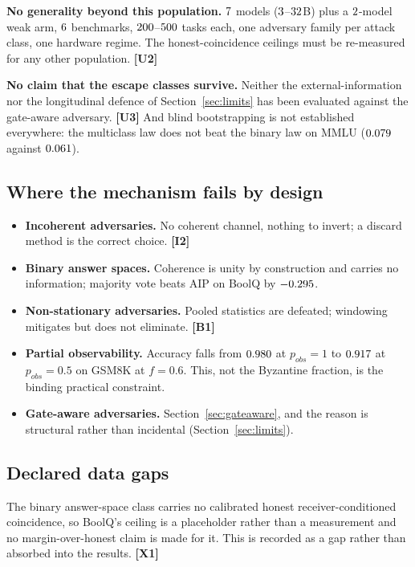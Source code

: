 \textbf{No generality beyond this population.} $7$ models
($3$--$32$B) plus a $2$-model weak arm,
$6$ benchmarks, $200$--$500$ tasks each, one
adversary family per attack class, one hardware regime. The honest-coincidence
ceilings must be re-measured for any other population. \textbf{[U2]}

\textbf{No claim that the escape classes survive.} Neither the
external-information nor the longitudinal defence of Section~\ref{sec:limits} has
been evaluated against the gate-aware adversary. \textbf{[U3]} And blind
bootstrapping is not established everywhere: the multiclass law does not beat the
binary law on MMLU ($0.079$ against $0.061$).

\subsection{Where the mechanism fails by design}

\begin{itemize}
\item \textbf{Incoherent adversaries.} No coherent channel, nothing to invert; a
      discard method is the correct choice. \textbf{[I2]}
\item \textbf{Binary answer spaces.} Coherence is unity by construction and
      carries no information; majority vote beats AIP on BoolQ by
      $-0.295$.
\item \textbf{Non-stationary adversaries.} Pooled statistics are defeated;
      windowing mitigates but does not eliminate. \textbf{[B1]}
\item \textbf{Partial observability.} Accuracy falls from
      $0.980$ at $p_{obs}=1$ to $0.917$ at
      $p_{obs}=0.5$ on GSM8K at $f=0.6$. This, not the Byzantine fraction, is the
      binding practical constraint.
\item \textbf{Gate-aware adversaries.} Section~\ref{sec:gateaware}, and the
      reason is structural rather than incidental (Section~\ref{sec:limits}).
\end{itemize}

\subsection{Declared data gaps}

The binary answer-space class carries no calibrated honest receiver-conditioned
coincidence, so BoolQ's ceiling is a placeholder rather than a measurement and no
margin-over-honest claim is made for it. This is recorded as a gap rather than
absorbed into the results. \textbf{[X1]}

